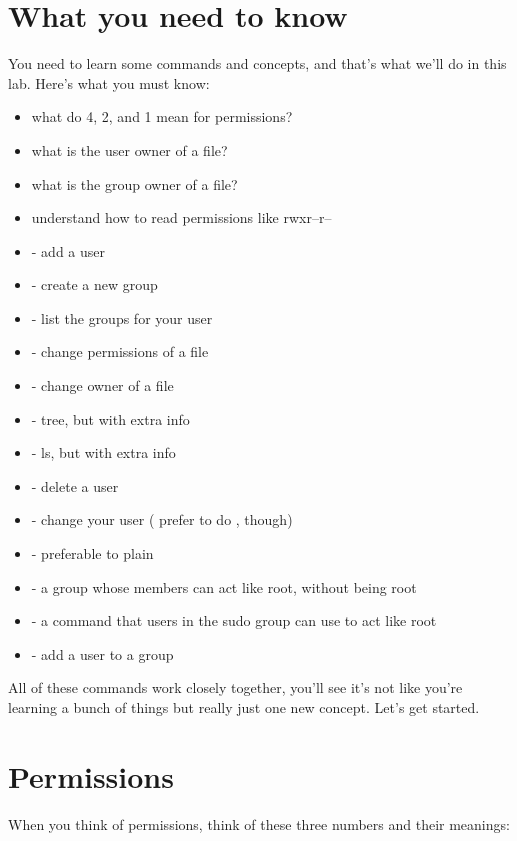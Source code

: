 \documentclass[12pt,a4]{article}
\begin{document}
\section{What you need to know}
You need to learn some commands and concepts, and that's what we'll do in this lab. Here's what you must know:
\begin{itemize}
\item what do 4, 2, and 1 mean for permissions?
\item what is the user owner of a file?
\item what is the group owner of a file?
\item understand how to read permissions like rwxr--r--
\item {} - add a user 
\item {} - create a new group
\item {} - list the groups for your user
\item {} - change permissions of a file
\item {} - change owner of a file
\item {} - tree, but with extra info
\item {} - ls, but with extra info
\item {} - delete a user
\item {} - change your user ( prefer to do , though)
\item {} - preferable to plain 
\item {} - a group whose members can act like root, without being root
\item {} - a command that users in the sudo group can use to act like root
\item {} - add a user to a group
\end{itemize}

All of these commands work closely together, you'll see it's not like you're learning a bunch of things but really just one new concept. Let's get started.

\section{Permissions}
When you think of permissions, think of these three numbers and their meanings:
\end{document}
